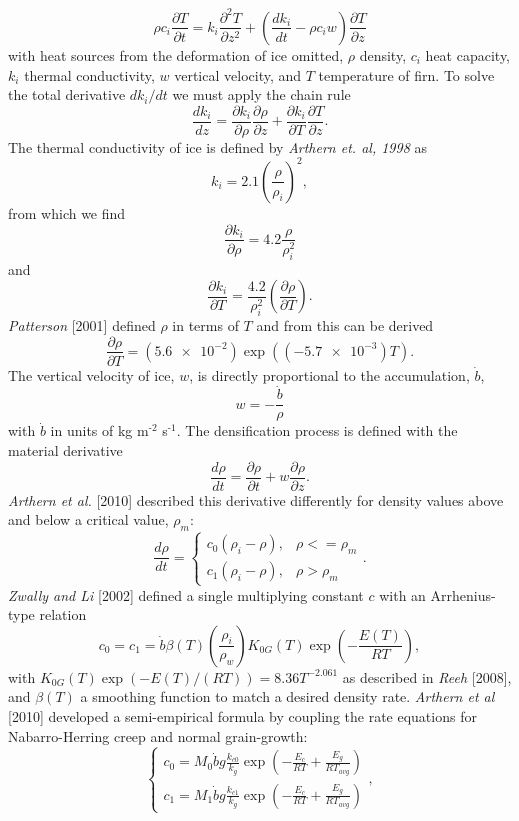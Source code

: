 \documentclass{article}%
\newcommand{\sups}[1]{\ensuremath{^{\textrm{#1}}}}
\begin{document}
  $$
  \rho c_i \frac{\partial T}{\partial t} = 
    k_i \frac{\partial^2 T}{\partial z^2} +
    \left( \frac{dk_i}{dt} - \rho c_i w \right) \frac{\partial T}{\partial z}
  $$
with heat sources from the deformation of ice omitted, $\rho$ density, $c_i$ heat capacity, $k_i$ thermal conductivity, $w$ vertical velocity, and $T$ temperature of firn.  To solve the total derivative $dk_i/dt$ we must apply the chain rule
  $$
  \frac{dk_i}{dz} = 
  \frac{\partial k_i}{\partial \rho} \frac{\partial \rho}{\partial z} + 
  \frac{\partial k_i}{\partial T} \frac{\partial T}{\partial z}.
  $$
The thermal conductivity of ice is defined by \emph{Arthern et. al, 1998} as
  $$k_i = 2.1 \left(\frac{\rho}{\rho_i}\right)^2,$$
from which we find
  $$
  \frac{\partial k_i}{\partial \rho} = 
    4.2 \frac{\rho}{\rho_i^2}
  $$
and
  $$
  \frac{\partial k_i}{\partial T} = 
    \frac{4.2}{\rho_i^2} \left( \frac{\partial \rho}{\partial T} \right).
  $$
\emph{Patterson} [2001] defined $\rho$ in terms of $T$ and from this can be derived
  $$
  \frac{\partial \rho}{\partial T} = 
    (\SI{5.6e-2}) \exp ((\SI{-5.7e-3})T).
  $$
The vertical velocity of ice, $w$, is directly proportional to the accumulation, $\dot{b}$,
  $$
  w = -\frac{\dot{b}}{\rho}
  $$
with $\dot{b}$ in units of kg m\sups{-2} s\sups{-1}.  The densification process is defined with the material derivative
  $$\frac{d \rho}{dt} = \frac{\partial \rho}{\partial t} + 
    w\frac{\partial \rho}{\partial z}.$$
\emph{Arthern et al.} [2010] described this derivative differently for density values above and below a critical value, $\rho_m$:  
  $$
  \frac{d \rho}{dt} = 
  \begin{cases}
   c_0(\rho_i - \rho), &\rho <= \rho_m\\
   c_1(\rho_i - \rho), &\rho > \rho_m
  \end{cases}.$$
\emph{Zwally and Li} [2002] defined a single multiplying constant $c$ with an Arrhenius-type relation
  $$
  c_0 = c_1 = 
  \dot{b} \beta(T)\left(\frac{\rho_i}{\rho_w}\right)
  K_{0G}(T)\exp \left( -\frac{E(T)}{RT} \right),
  $$
with $K_{0G}(T) \exp(-E(T)/(RT)) = 8.36T^{-2.061}$ as described in \emph{Reeh} [2008], and $\beta(T)$ a smoothing function to match a desired density rate.  \emph{Arthern et al} [2010] developed a semi-empirical formula by coupling the rate equations for Nabarro-Herring creep and normal grain-growth: 
  $$
  \begin{cases}
    c_0 = M_0 \dot{b}g\frac{k_{c0}}{k_g}\exp\left(-\frac{E_c}{RT} + 
          \frac{E_g}{RT_{avg}}\right)\\
    c_1 = M_1 \dot{b}g\frac{k_{c1}}{k_g}\exp\left(-\frac{E_c}{RT} + 
          \frac{E_g}{RT_{avg}}\right)
  \end{cases},
  $$
\end{document}

